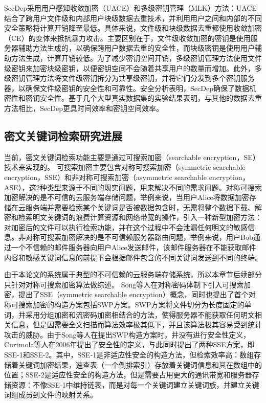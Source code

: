 \documentclass[promaster]{thesis-uestc}
\begin{document}
SecDep采用用户感知收敛加密（UACE）和多级密钥管理（MLK）方法：UACE结合了跨用户文件级和内部用户块级数据去重技术，并利用用户之间和内部的不同安全策略将计算开销降至最低。具体来说，文件级和块级数据去重都使用收敛加密（CE）的变体来抵抗暴力攻击。主要区别在于，文件级收敛加密的密钥是使用服务器辅助方法生成的，以确保跨用户数据去重的安全性，而块级密钥是使用用户辅助方法生成，计算开销较低。为了减少密钥空间开销，多级密钥管理方法使用文件级密钥来加密块级密钥，以便密钥空间不会随着共享用户的数量而增加。此外，多级密钥管理方法将文件级密钥拆分为共享级密钥，并将它们分发到多个密钥服务器，以确保文件级密钥的安全性和可靠性。安全分析表明，SecDep确保了数据机密性和密钥安全性。基于几个大型真实数据集的实验结果表明，与其他的数据去重方法相比，SecDep更具时间效率和密钥空间效率。

\subsection{密文关键词检索研究进展}\label{密文关键词检索技术研究进展}
当前，密文关键词检索功能主要是通过可搜索加密（searchable encryption，SE）技术来实现的。
可搜索加密主要包含对称可搜索加密（symmetric searchable encryption，SSE）和非对称可搜索加密（asymmetric searchable encryption，ASE），这2种类型来源于不同的现实问题，用来解决不同的需求问题。对称可搜索加密解决的是不可信的云服务端存储问题，举例来说，当用户Alice将数据加密存储在云服务端并需要检索某个关键词是否被数据包含时，无需将整个数据下载、解密和检索明文关键词的浪费计算资源和网络带宽的操作，引入一种新型加密方法：对加密后的文件可以执行检索功能，并在这个过程中不会泄漏任何明文的敏感信息。非对称可搜索加密解决的是不可信赖服务器路由问题，举例来说，用户Bob通过一个不信赖的邮件服务器向用户Alice发送邮件，该邮件服务器在不能获取邮件内容和敏感关键词信息的前提下会根据邮件包含的不同关键词发送到不同的终端。


由于本论文的系统属于典型的不可信赖的云服务端存储系统，所以本章节后续部分只针对对称可搜索加密算法做综述。
Song等人在对称密码体制下引入可搜索加密，提出了SSE（symmetric searchable encryption）概念，同时也提出了首个对称可搜索加密的构造方案包括SWP方案。SWP方案将文件切分为长度固定的单词，并采用分组加密和流密码加密相结合的方法，使得服务器不能获取任何明文相关信息，但是因需要全文扫描而算法效率极其低下，并且该算法极其容易受到统计攻击的威胁。由于Song等人在提出SWP构造方案时，并没有进行安全性定义，Curtmola等人在2006年提出了安全性的定义，与此同时提出了两种SSE方案，即SSE-1和SSE-2。其中，SSE-1是非适应性安全的构造方法，但检索效率高：数组存储着关键词加密结果，速查表（一个倒排索引）存放着关键词信息和其在数组中的位置；SSE-2是适应性安全的构造方法，但是需要占用更大的通讯带宽和服务器存储资源：不像SSE-1中维持链表，而是对每一个关键词建立关键词族，并建立关键词组成员到文件的映射关系。
\end{document}
